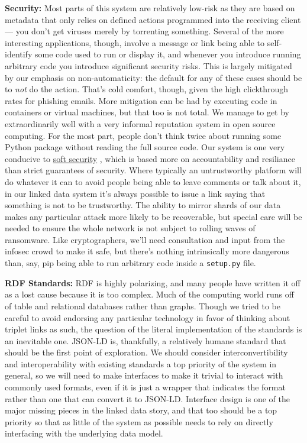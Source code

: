 \textbf{Security:} Most parts of this system are relatively low-risk as
they are based on metadata that only relies on defined actions
programmed into the receiving client --- you don't get viruses merely by
torrenting something. Several of the more interesting applications,
though, involve a message or link being able to self-identify some code
used to run or display it, and whenever you introduce running arbitrary
code you introduce significant security risks. This is largely mitigated
by our emphasis on non-automaticity: the default for any of these cases
should be to \emph{not} do the action. That's cold comfort, though,
given the high clickthrough rates for phishing emails. More mitigation
can be had by executing code in containers or virtual machines, but that
too is not total. We manage to get by extraordinarily well with a very
informal reputation system in open source computing. For the most part,
people don't think twice about running some Python package without
reading the full source code. Our system is one very conducive to
\href{http://meatballwiki.org/wiki/?SoftSecurity}{soft security} \citep{meatballwikiSoftSecurity} , which is based more on
accountability and resiliance than strict guarantees of security. Where
typically an untrustworthy platform will do whatever it can to avoid
people being able to leave comments or talk about it, in our linked data
system it's always possible to issue a link saying that something is not
to be trustworthy. The ability to mirror shards of our data makes any
particular attack more likely to be recoverable, but special care will
be needed to ensure the whole network is not subject to rolling waves of
ransomware. Like cryptographers, we'll need consultation and input from
the infosec crowd to make it safe, but there's nothing intrinsically
more dangerous than, say, pip being able to run arbitrary code inside a
\texttt{setup.py} file.

\textbf{RDF Standards:} RDF is highly polarizing, and many people have
written it off as a lost cause because it is too complex. Much of the
computing world runs off of table and relational databases rather than
graphs. Though we tried to be careful to avoid endorsing any particular
technology in favor of thinking about triplet links as such, the
question of the literal implementation of the standards is an inevitable
one. JSON-LD is, thankfully, a relatively humane standard that should be
the first point of exploration. We should consider interconvertibility
and interoperability with existing standards a top priority of the
system in general, so we will need to make interfaces to make it trivial
to interact with commonly used formats, even if it is just a wrapper
that indicates the format rather than one that can convert it to
JSON-LD. Interface design is one of the major missing pieces in the
linked data story, and that too should be a top priority so that as
little of the system as possible needs to rely on directly interfacing
with the underlying data model.

